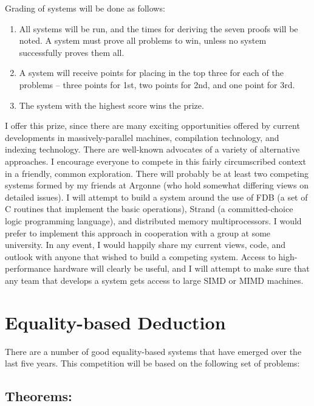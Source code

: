 Grading of systems will be done as follows:

\begin{enumerate}
\item All systems will be run, and the times for deriving the seven
	   proofs will be noted.  A system must prove  all problems 
           to win, unless no system successfully proves them all.

\item A system will receive points for placing in the top three for each
	   of the problems -- three points for 1st, two points for 2nd, and
           one point for 3rd.

\item The system with the highest score wins the prize.
\end{enumerate}

I offer this prize, since there are many exciting opportunities offered by
current developments in massively-parallel machines, compilation technology,
and indexing technology.  There are well-known advocates of a variety of
alternative approaches.  I encourage everyone to compete in this fairly
circumscribed context in a friendly, common exploration.  There will probably
be at least two competing systems formed by my friends at Argonne (who hold
somewhat differing views on detailed issues).  I will attempt to build a
system around the use of FDB (a set of C routines that implement the basic
operations), Strand (a committed-choice logic programming language), and
distributed memory multiprocessors.  I would prefer to implement this approach
in cooperation with a group at some university.  In any event, I would happily
share my current views, code, and outlook with anyone that wished to build a
competing system.  Access to high-performance hardware will clearly be useful,
and I will attempt to make sure that any team that develops a system gets
access to large SIMD or MIMD machines.


\section*{Equality-based Deduction}

There are a number of good equality-based systems that have emerged over the
last five years.  This competition will be based on the following set of
problems:

\subsection*{Theorems:}

